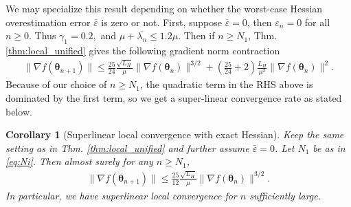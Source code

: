 \documentclass[11pt]{amsart}
\theoremstyle{plain}
\newtheorem{corollary}[theorem]{Corollary}
\theoremstyle{definition}
\theoremstyle{remark}
\def\eps{\varepsilon}
\def\param{\boldsymbol{\theta}}
\newcommand{\commHL}[1]{{\textcolor{blue}{#1}}}
\begin{document}
We may specialize this result depending on whether the worst-case Hessian overestimation error $\overline{\eps}$ is zero or not. First, suppose $\overline{\eps}=0$, then $\eps_n=0$ for all $n\geq 0$. Thus $\gamma_1=0.2,$ and $\mu+\overline{\lambda_n}\leq 1.2\mu.$ %
Then if $n\geq N_1$, Thm. \ref{thm:local_unified} gives the following  gradient norm contraction
\begin{align}\label{eq:grad_contraction2}
\|\nabla f(\param_{n+1})\|\leq \frac{25}{24}\frac{\sqrt{L_H}}{\mu}\|\nabla f(\param_n)\|^{3/2}+\left(\frac{25}{24}+2 \right)\frac{L_H}{\mu^2}\|\nabla f(\param_n)\|^2.
\end{align}
Because of our choice of $n\ge N_{1}$, the quadratic term in the RHS above is dominated by the first term, so we get a super-linear convergence rate as stated below. 




\begin{corollary}[Superlinear local convergence with exact Hessian]\label{cor:exact}
Keep the same setting as in Thm. \ref{thm:local_unified} and further assume $\bar{\eps}=0$. %
Let $N_{1}$ be as in \eqref{eq:Ni}.
Then almost surely for any $n\geq  N_{1}$, 
\begin{align*}
    \|\nabla f(\param_{n+1})\|\leq \frac{25}{12}\frac{\sqrt{L_H}}{\mu}\|\nabla f(\param_n)\|^{3/2}. %
\end{align*}
In particular, we have superlinear local convergence for $n$ sufficiently large. 
\end{corollary}
\end{document}
